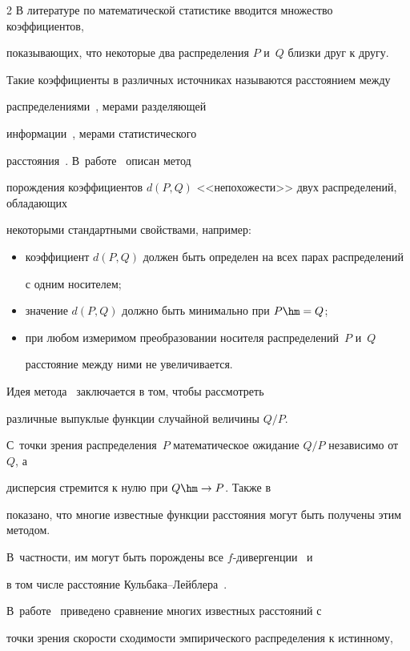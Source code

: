 \begin{multicols}{2}
В литературе по математической статистике вводится множество коэффициентов,

показывающих, что некоторые два распределения $P$ и~$Q$ близки друг к другу.

Такие коэффициенты в различных источниках называются расстоянием между

распределениями~\cite{Kullback1959}, мерами разделяющей

информации~\cite{Chernoff1952}, мерами статистического

расстояния~\cite{Kolmogorov1965}. В~работе~\cite{AliSilvey1966} описан метод

порождения коэффициентов $d(P, Q)$ <<непохожести>> двух распределений, обладающих

некоторыми стандартными свойствами, например:

\begin{itemize}

\item коэффициент $d(P, Q)$ должен быть определен на всех парах распределений

с одним носителем;

\item значение $d(P, Q)$ должно быть минимально при $P \hm= Q$;

\item при любом измеримом преобразовании носителя распределений~$P$ и~$Q$

расстояние между ними не увеличивается.

\end{itemize}

Идея метода~\cite{AliSilvey1966} заключается в том, чтобы рас\-смот\-реть

различные выпуклые функции случайной величины $Q/P$.

С~точки зрения распределения~$P$ математическое ожидание $Q/P$ независимо от~$Q$, а

дисперсия стремится к нулю при $Q \hm\to P$. Также в~\cite{AliSilvey1966}

показано, что многие известные функции расстояния могут быть получены этим методом.

В~частности, им могут быть порождены все $f$-ди\-вер\-ген\-ции~\cite{scizar2004} и

в том числе расстояние Куль\-ба\-ка--Лейб\-ле\-ра~\cite{Kullback1959}.

В~работе~\cite{Gibs} приведено сравнение многих известных расстояний с

точки зрения скорости схо\-ди\-мости эмпирического распределения к истинному,


\end{multicols}
